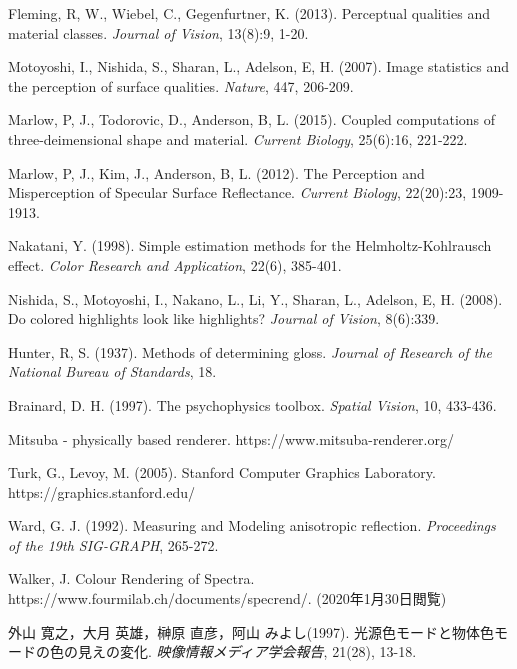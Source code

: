 \begin{thebibliography}{99}%

    Fleming, R, W., Wiebel, C., Gegenfurtner, K. (2013).
    Perceptual qualities and material classes.
    {\it Journal of Vision}, 13(8):9, 1-20.

    Motoyoshi, I., Nishida, S., Sharan, L., Adelson, E, H. (2007).
    Image statistics and the perception of surface qualities.
    {\it Nature}, 447, 206-209.

    Marlow, P, J., Todorovic, D., Anderson, B, L. (2015).
    Coupled computations of three-deimensional shape and material.
    {\it Current Biology}, 25(6):16, 221-222.

    Marlow, P, J., Kim, J., Anderson, B, L. (2012).
    The Perception and Misperception of Specular Surface Reflectance.
    {\it Current Biology}, 22(20):23, 1909-1913.

    Nakatani, Y. (1998).
    Simple estimation methods for the Helmholtz-Kohlrausch effect.
    {\it Color Research and Application}, 22(6), 385-401.

    Nishida, S., Motoyoshi, I., Nakano, L., Li, Y., Sharan, L., Adelson, E, H. (2008).
    Do colored highlights look like highlights?
    {\it Journal of Vision}, 8(6):339.

    Hunter, R, S. (1937).
    Methods of determining gloss.
    {\it Journal of Research of the National Bureau of Standards}, 18.

    Brainard, D. H. (1997).
    The psychophysics toolbox.
    {\it Spatial Vision}, 10, 433-436.

    Mitsuba - physically based renderer. https://www.mitsuba-renderer.org/

    Turk, G., Levoy, M. (2005).
    Stanford Computer Graphics Laboratory. https://graphics.stanford.edu/

    Ward, G. J. (1992).
    Measuring and Modeling anisotropic reflection.
    {\it Proceedings of the 19th SIG-GRAPH}, 265-272.

    Walker, J. Colour Rendering of Spectra. \\
    https://www.fourmilab.ch/documents/specrend/. (2020年1月30日閲覧)

    外山 寛之，大月 英雄，榊原 直彦，阿山 みよし(1997).
    光源色モードと物体色モードの色の見えの変化.
    {\it 映像情報メディア学会報告}, 21(28), 13-18.

\end{thebibliography}
